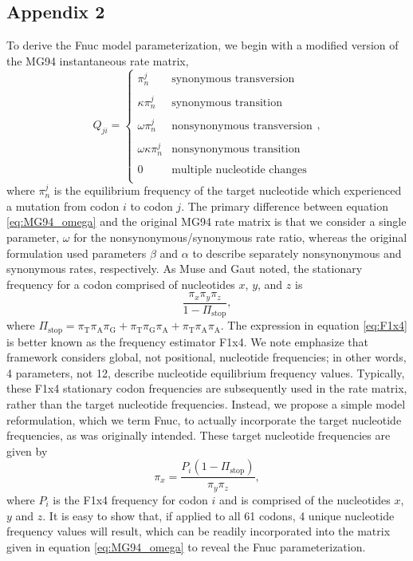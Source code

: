 \documentclass{pnastwo}
\begin{document}
\begin{article}
\section*{Appendix 2}
To derive the Fnuc model parameterization, we begin with a modified version of the MG94 \cite{MuseGaut1994} instantaneous rate matrix, 
\begin{equation}\label{eq:MG94_omega}
Q_{ji} = \left\{ 
\begin{array}{rl}
\pi_n^j                  &\mbox{synonymous transversion} \\\\
\kappa \pi_n^j           &\mbox{synonymous transition} \\\\
\omega \pi_n^j           &\mbox{nonsynonymous transversion} \\\\
\omega \kappa \pi_n^j    &\mbox{nonsynonymous transition} \\\\
0                        &\mbox{multiple nucleotide changes} \\           
\end{array} \right.,
\end{equation}
where $\pi_n^j$ is the equilibrium frequency of the target nucleotide which experienced a mutation from codon $i$ to codon $j$. The primary difference between equation \eqref{eq:MG94_omega} and the original MG94 rate matrix is that we consider a single parameter, $\omega$ for the nonsynonymous/synonymous rate ratio, whereas the original formulation used parameters $\beta$ and $\alpha$ to describe separately nonsynonymous and synonymous rates, respectively. As Muse and Gaut \cite{MuseGaut1994} noted, the stationary frequency for a codon comprised of nucleotides $x$, $y$, and $z$ is
\begin{equation}\label{eq:F1x4}
\frac{\pi_x\pi_y\pi_z}{1 - \Pi_\text{stop}}, 
\end{equation}
where $\Pi_\text{stop} = \pi_\text{T}\pi_\text{A}\pi_\text{G} + \pi_\text{T}\pi_\text{G}\pi_\text{A} + \pi_\text{T}\pi_\text{A}\pi_\text{A}$. The expression in equation \eqref{eq:F1x4} is better known as the frequency estimator F1x4. We note emphasize that framework considers global, not positional, nucleotide frequencies; in other words, 4 parameters, not 12, describe nucleotide equilibrium frequency values. Typically, these F1x4 stationary codon frequencies are subsequently used in the rate matrix, rather than the target nucleotide frequencies. Instead, we propose a simple model reformulation, which we term Fnuc, to actually incorporate the target nucleotide frequencies, as was originally intended. These target nucleotide frequencies are given by 
\begin{equation}
\pi_x = \frac{P_i(1 - \Pi_\text{stop})}{\pi_y\pi_z}, 
\end{equation} where $P_i$ is the F1x4 frequency for codon $i$ and is comprised of the nucleotides $x$, $y$ and $z$. It is easy to show that, if applied to all 61 codons, 4 unique nucleotide frequency values will result, which can be readily incorporated into the matrix given in equation \eqref{eq:MG94_omega} to reveal the Fnuc parameterization.


\end{article}
\end{document}
